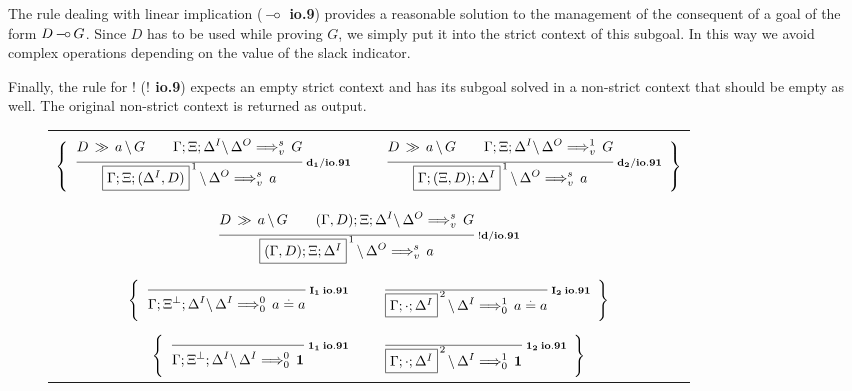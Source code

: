 The rule dealing with linear implication ({\bf $\, \mbox{$-\!\circ$} \,$ io.9}) provides a
reasonable solution to the management of the consequent of a goal of the form
$D \, \mbox{$-\!\circ$} \, G$. Since $D$ has to be used while proving $G$, we simply put it
into the strict context of this subgoal. In this way we avoid complex
operations depending on the value of the slack indicator.

Finally, the rule for $!$ ({\bf $!$ io.9}) expects an empty strict context
and has its subgoal solved in a non-strict context that should be empty as
well. The original non-strict context is returned as output.


\clearpage
\begin{figure}[t]
  \begin{center}
    \leavevmode

    \begin{tabular}{|c|}
      \hline \\
      $\left\{
        \begin{array}{ccc}
          \ruleII
            {\decd{D}{a}{G}}
            {\ioIXb{\G;\X;\D^I}{\D^O}{G}{v}{s}}
            {\ioIXb{\fb{\G;\X;(\D^I,D)}{1}}{\D^O}{a}{v}{s}}
            {d_1/io.91}
        &
          \hspace{0.5em}
        &
          \ruleII
            {\decd{D}{a}{G}}
            {\ioIXb{\G;\X;\D^I}{\D^O}{G}{v}{1}}
            {\ioIXb{\fb{\G;(\X,D);\D^I}{1}}{\D^O}{a}{v}{s}}
            {d_2/io.91}
        \end{array}
      \right\}$

      \\ \\ \\
      $\ruleII
        {\decd{D}{a}{G}}
        {\ioIXb{(\G,D);\X;\D^I}{\D^O}{G}{v}{s}}
        {\ioIXb{\fb{(\G,D);\X;\D^I}{1}}{\D^O}{a}{v}{s}}
        {!d/io.91}$

      \\ \\
      $\left\{
        \begin{array}{ccc}
          \ruleI
            {}
            {\ioIXb{\G;\X^\Bot;\D^I}{\D^I}{\eq{a}{a}}{0}{0}}
            {I_1 \: io.91}
        &
          \hspace{0.5em}
        &
          \ruleI
            {}
            {\ioIXb{\fb{\G;\cdot;\D^I}{2}}{\D^I}{\eq{a}{a}}{0}{1}}
            {I_2 \: io.91}
        \end{array}
      \right\}$

      \\ \\
      $\left\{
        \begin{array}{ccc}
          \ruleI
            {}
            {\ioIXb{\G;\X^\Bot;\D^I}{\D^I}{\One}{0}{0}}
            {\One_1 \: io.91}
        &
          \hspace{0.5em}
        &
          \ruleI
            {}
            {\ioIXb{\fb{\G;\cdot;\D^I}{2}}{\D^I}{\One}{0}{1}}
            {\One_2 \: io.91}
        \end{array}
      \right\}$


\end{tabular}
\end{center}
\end{figure}
